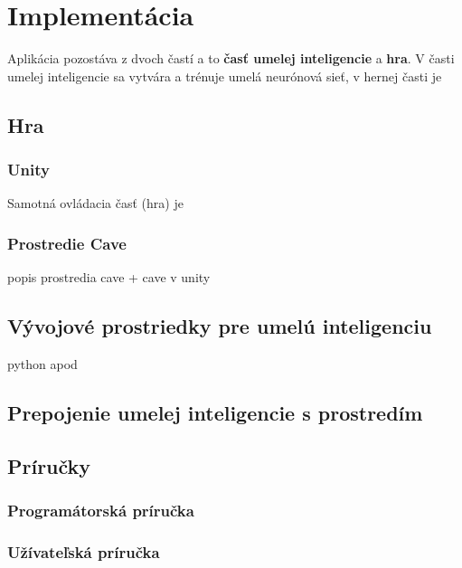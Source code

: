 \section{Implementácia}\label{sec:programming}

Aplikácia pozostáva z dvoch častí a to \textbf{časť umelej inteligencie} a \textbf{hra}.
V časti umelej inteligencie sa vytvára a trénuje umelá neurónová sieť, v hernej časti je


\subsection{Hra}\label{subsec:controlling}
\subsubsection{Unity}
Samotná ovládacia časť (hra) je
\subsubsection{Prostredie Cave}
popis prostredia cave + cave v unity
\subsection{Vývojové prostriedky pre umelú inteligenciu}\label{subsec:dev-tools-for-ai}
python apod
\subsection{Prepojenie umelej inteligencie s prostredím}\label{subsec:connection}

\subsection{Príručky}\label{subsec:helpers}
\subsubsection{Programátorská príručka}
\subsubsection{Užívateľská príručka}